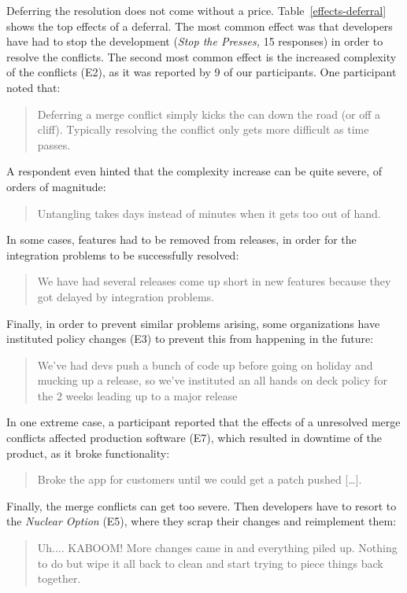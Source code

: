 
Deferring the resolution does not come without a price.
Table~\ref{effects-deferral} shows the top effects of a deferral.
The most common effect was that developers have had to stop the development (\emph{Stop the Presses,} 15 responses) in order to resolve the conflicts.
The second most common effect is the increased complexity of the conflicts (E2), as it was reported by 9 of our participants.
One participant noted that:
\begin{quotation}
	Deferring a merge conflict simply kicks the can down the road (or off a cliff). Typically resolving the conflict only gets more difficult as time passes.
\end{quotation}
A respondent even hinted that the complexity increase can be quite severe, of orders of magnitude:
\begin{quotation}
	Untangling takes days instead of minutes when it gets too out of hand.
\end{quotation}
In some cases, features had to be removed from releases, in order for the integration problems to be successfully resolved:
\begin{quotation}
	We have had several releases come up short in new features because they got delayed by integration problems.
\end{quotation}
Finally, in order to prevent similar problems arising, some organizations have instituted policy changes (E3) to prevent this from happening in the future:
\begin{quotation}
	We've had devs push a bunch of code up before going on holiday and mucking up a release, so we've instituted an all hands on deck policy for the 2 weeks leading up to a major release
\end{quotation}

In one extreme case, a participant reported that the effects of a unresolved merge conflicts affected production software (E7), which resulted in downtime of the product, as it broke functionality:
\begin{quotation}
	Broke the app for customers until we could get a patch pushed [\ldots].
\end{quotation}
Finally, the merge conflicts can get too severe.
Then developers have to resort to the \emph{Nuclear Option} (E5), where they scrap their changes and reimplement them:
\begin{quotation}
	Uh.... KABOOM! More changes came in and everything piled up. Nothing to do but wipe it all back to clean and start trying to piece things back together.
\end{quotation}

